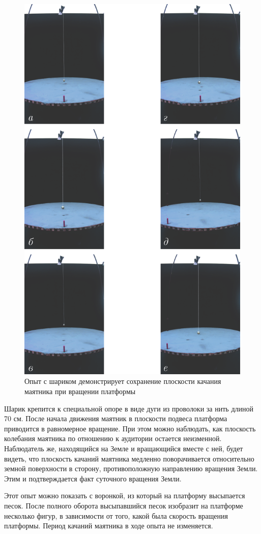 \documentclass[14pt,a4paper,oneside]{extarticle}	%
\begin{document}
	\begin{figure}[H] 	
		\centering 	
		\includegraphics[width=0.6\linewidth]{fuko-2.png}
		\caption{Опыт с шариком демонстрирует сохранение плоскости качания маятника при вращении платформы}
		\label{fuko-2}
	\end{figure}
	
	Шарик крепится к специальной опоре в виде дуги из проволоки за нить длиной 70 см.
	После начала движения маятник в плоскости подвеса платформа приводится в равномерное вращение.
	При этом можно наблюдать, как плоскость колебания маятника по отношению к аудитории остается неизменной.
	Наблюдатель же, находящийся на Земле и вращающийся вместе с ней, 
	будет видеть, что плоскость качаний маятника медленно поворачивается относительно земной 
	поверхности в сторону, противоположную направлению вращения Земли.
	Этим и подтверждается факт суточного вращения Земли.
		
	Этот опыт можно показать с воронкой, из который на платформу высыпается песок.
	После полного оборота высыпавшийся песок изобразит на платформе несколько фигур, в зависимости от того, какой была скорость вращения платформы.
	Период качаний маятника в ходе опыта не изменяется.
	
\end{document}
